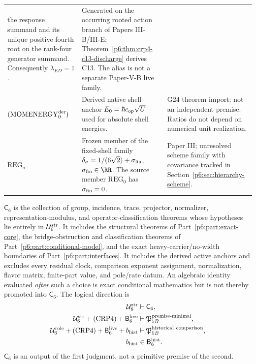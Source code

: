 \documentclass[12pt,a4paper]{article}
\newcommand{\CoreSix}{\mathsf C_6}
\newcommand{\BridgeLive}{\mathsf B_6^{\rm live}}
\newcommand{\BridgeRaw}{\mathsf B_6^{\rm hist}}
\newcommand{\Ubase}{\mathcal U_6^{\rm str}}
\newcommand{\Urole}{\mathcal U_6^{\rm role}}
\begin{document}
\begin{table}[H]
\begin{tabularx}{\textwidth}{@{}L{0.18\textwidth}L{0.49\textwidth}Y@{}}
the response summand and its unique positive fourth root on the rank-four
generator summand.  Consequently \(\lambda_{ED}=1\).
& Generated on the occurring rooted action branch of Papers III-B/III-E;
Theorem~\ref{p6:thm:crp4-c13-discharge} derives C13.  The alias is not a
separate Paper-V-B live family.\\
\((\mathrm{MOMENERGY}_{0}^{\rm der})\)
& Derived native shell anchor \(E_0=\hbar c_{\rm op}\sqrt U\) used for absolute shell energies.
& G24 theorem import; not an independent premise. Ratios do not depend on numerical unit realization.\\
\(\mathrm{REG}_{\sigma}\)
& Frozen member of the fixed-shell family
\(\delta_{\sigma}=1/(6\sqrt2)+\sigma_{\rm fin}\),
\(\sigma_{\rm fin}\in\RR\).  The source member \(\mathrm{REG}_0\) has
\(\sigma_{\rm fin}=0\).
& Paper III; unresolved scheme family with covariance tracked in
Section~\ref{p6:sec:hierarchy-scheme}.\\
\bottomrule
\end{tabularx}
\end{table}

\begin{definition}
\label{p6:def:corrected-finite-core}
\(\CoreSix\) is the collection of group, incidence, trace, projector,
normalizer, representation-modulus, and operator-classification theorems
whose hypotheses lie entirely in \(\Ubase\).  It includes the structural
theorems of Part~\ref{p6:part:exact-core}, the bridge-obstruction and
classification theorems of Part~\ref{p6:part:conditional-model}, and the
exact heavy-carrier/no-width boundaries of
Part~\ref{p6:part:interfaces}.  It includes the derived active anchors and
excludes every residual clock, comparison exponent assignment,
normalization, flavor matrix, finite-part value, and pole/rate datum.
An algebraic identity evaluated \emph{after} such a choice is exact
conditional mathematics but is not thereby promoted into \(\CoreSix\).
The logical direction is
\[
\begin{aligned}
\Ubase&\vdash\CoreSix,\\
\Ubase+(\mathrm{CRP4})+\BridgeLive
&\vdash\mathfrak P_{5B}^{\rm premise\text{-}minimal},\\
\Urole+(\mathrm{CRP4})+\BridgeLive+b_{\rm hist}
&\vdash\mathfrak P_{5B}^{\rm historical\ comparison},\\
b_{\rm hist}&\in\BridgeRaw.
\end{aligned}
\]
\(\CoreSix\) is an output of the first judgment, not a primitive premise of
the second.
\end{definition}
\end{document}
